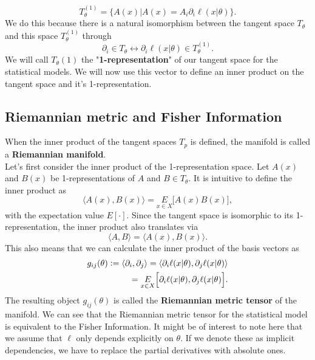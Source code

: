 \begin{equation}
	T_\theta^{(1)} = \{A(x) | A(x) = A_i \partial_i \ell(x|\theta)\}.
\end{equation}
We do this because there is a natural isomorphism between the tangent space $T_\theta$ and this space $T_\theta^{(1)}$ through 
\begin{equation}
	\partial_i \in T_\theta \leftrightarrow \partial_i \ell(x|\theta) \in T_\theta^{(1)}.
\end{equation}
We will call $T_\theta{(1)}$ the "\textbf{1-representation}" of our tangent space for the statistical models. We will now use this vector to define an inner product on the tangent space and it's 1-representation.\\
\subsection{Riemannian metric and Fisher Information}
When the inner product of the tangent spaces $T_p$ is defined, the manifold is called a \textbf{Riemannian manifold}.\\
Let's first consider the inner product of the 1-representation space. Let $A(x)$ and $B(x)$ be 1-representations of $A$ and $B \in T_\theta$. It is intuitive to define the inner product as 
\begin{equation}
	\langle A(x), B(x) \rangle = \underset{x\in X}{E} \Big[A(x) B(x)\Big],
\end{equation}
with the expectation value $E[\cdot]$. Since the tangent space is isomorphic to its 1-representation, the inner product also translates via 
\begin{equation}
	\langle A, B \rangle = \langle A(x),B(x) \rangle.
\end{equation}
This also means that we can calculate the inner product of the basis vectors as 
\begin{equation}
	\begin{split}
		g_{ij}(\theta) \vcentcolon= \langle \partial_i, \partial_j\rangle = \langle \partial_i\ell(x|\theta), \partial_j\ell(x|\theta)\rangle \\
		= \underset{x \in X}{E} \Big[\partial_i\ell(x|\theta), \partial_j\ell(x|\theta)\Big].
	\end{split}
\end{equation}
The resulting object $g_{ij}(\theta)$ is called the \textbf{Riemannian metric tensor} of the manifold. We can see that the Riemannian metric tensor for the statistical model is equivalent to the Fisher Information. It might be of interest to note here that we assume that $\ell$ only depends explicitly on $\theta$. If we denote these as implicit dependencies, we have to replace the partial derivatives with absolute ones.\\
